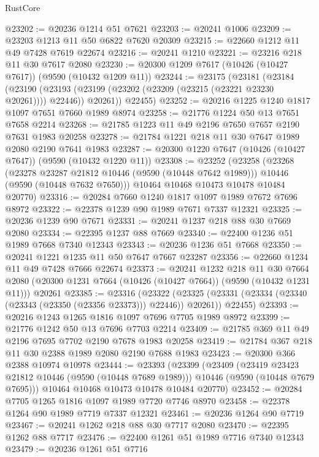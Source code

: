 \begin{lexlean}{RustCore}
\begin{coremodule}
@23202 := @20236 @1214 @51 @7621
@23203 := @20241 @1006
@23209 := @23203 @1213 @11 @50 @6822 @7620 @20309
@23215 := @22660 @1212 @11 @49 @7428 @7619 @22674
@23216 := @20241 @1210
@23221 := @23216 @218 @11 @30 @7617 @2080
@23230 := @20300 @1209 @7617 (@10426 (@10427 @7617)) (@9590 (@10432 @1209 @11))
@23244 := @23175
    (@23181
      (@23184
        (@23190 (@23193 (@23199 (@23202 (@23209 (@23215 (@23221 @23230 @20261)))) @22446)) @20261))
      @22455)
@23252 := @20216 @1225 @1240 @1817 @1097 @7651 @7660 @1989 @8974
@23258 := @21776 @1224 @50 @13 @7651 @7658 @2214
@23268 := @21785 @1223 @11 @49 @2196 @7650 @7657 @2190 @7631 @1983 @20258
@23278 := @21784 @1221 @218 @11 @30 @7647 @1989 @2080 @2190 @7641 @1983
@23287 := @20300 @1220 @7647 (@10426 (@10427 @7647)) (@9590 (@10432 @1220 @11))
@23308 := @23252
    (@23258
      (@23268
        (@23278 @23287 @21812 @10446 (@9590 (@10448 @7642 @1989)))
        @10446
        (@9590 (@10448 @7632 @7650)))
      @10464
      @10468
      @10473
      @10478
      @10484
      @20770)
@23316 := @20284 @7660 @1240 @1817 @1097 @1989 @7672 @7696 @8972
@23322 := @22378 @1239 @90 @1989 @7671 @7337 @12321
@23325 := @20236 @1239 @90 @7671
@23331 := @20241 @1237 @218 @88 @30 @7669 @2080
@23334 := @22395 @1237 @88 @7669
@23340 := @22400 @1236 @51 @1989 @7668 @7340 @12343
@23343 := @20236 @1236 @51 @7668
@23350 := @20241 @1221 @1235 @11 @50 @7647 @7667 @23287
@23356 := @22660 @1234 @11 @49 @7428 @7666 @22674
@23373 := @20241
    @1232
    @218
    @11
    @30
    @7664
    @2080
    (@20300 @1231 @7664 (@10426 (@10427 @7664)) (@9590 (@10432 @1231 @11)))
    @20261
@23385 := @23316
    (@23322
      (@23325 (@23331 (@23334 (@23340 (@23343 (@23350 (@23356 @23373))) @22446)) @20261))
      @22455)
@23393 := @20216 @1243 @1265 @1816 @1097 @7696 @7705 @1989 @8972
@23399 := @21776 @1242 @50 @13 @7696 @7703 @2214
@23409 := @21785 @369 @11 @49 @2196 @7695 @7702 @2190 @7678 @1983 @20258
@23419 := @21784 @367 @218 @11 @30 @2388 @1989 @2080 @2190 @7688 @1983
@23423 := @20300 @366 @2388 @10974 @10978
@23444 := @23393
    (@23399
      (@23409
        (@23419 @23423 @21812 @10446 (@9590 (@10448 @7689 @1989)))
        @10446
        (@9590 (@10448 @7679 @7695)))
      @10464
      @10468
      @10473
      @10478
      @10484
      @20770)
@23452 := @20284 @7705 @1265 @1816 @1097 @1989 @7720 @7746 @8970
@23458 := @22378 @1264 @90 @1989 @7719 @7337 @12321
@23461 := @20236 @1264 @90 @7719
@23467 := @20241 @1262 @218 @88 @30 @7717 @2080
@23470 := @22395 @1262 @88 @7717
@23476 := @22400 @1261 @51 @1989 @7716 @7340 @12343
@23479 := @20236 @1261 @51 @7716

\end{coremodule}
\end{lexlean}
